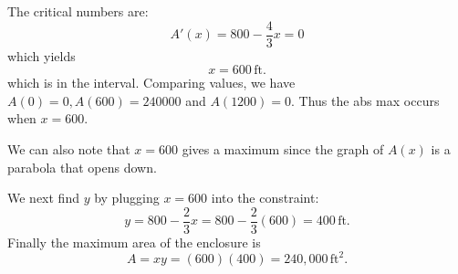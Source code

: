 \documentclass[handout]{ximera}
\begin{document}
\begin{example}[example 1]
The critical numbers are:
\[A'(x) = 800 - \frac43 x = 0 \]
which yields
\[x= 600 \,\mbox{ft.}\]
which is in the interval. Comparing values, we have $A(0) = 0, A(600) = 240000$ and $A(1200) = 0$.
Thus the abs max occurs when $x = 600$. 

We can also note that $x = 600$ gives a maximum since the graph of $A(x)$ is a parabola that opens down.


\begin{image}
\end{image}


We next find $y$ by plugging $x = 600$ into the constraint:
\[y = 800 - \frac23 x = 800 - \frac23(600) = 400 \,\mbox{ft.}\]
Finally the maximum area of the enclosure is
\[A = xy = (600)(400) = 240{,}000 \,\mbox{ft$^2$}.\]
\end{example}


\begin{center}
\begin{foldable}
\end{foldable}
\end{center}
\end{document}
